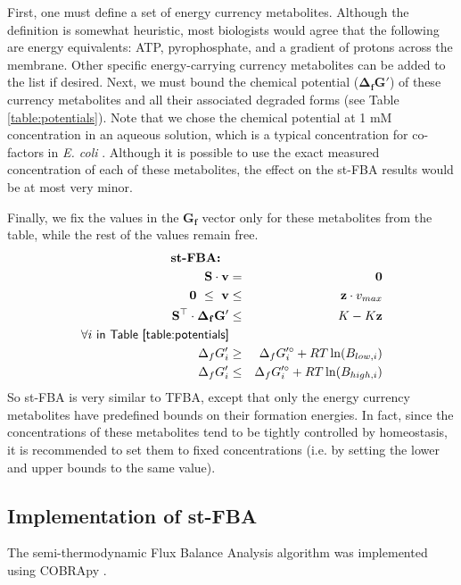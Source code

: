 \documentclass[twocolumn]{article}
\begin{document}
First, one must define a set of energy currency metabolites. Although the definition is somewhat heuristic, most biologists would agree that the following are energy equivalents: ATP, pyrophosphate, and a gradient of protons across the membrane. Other specific energy-carrying currency metabolites can be added to the list if desired. Next, we must bound the chemical potential ($\mathbf{\Delta_f G'}$) of these currency metabolites and all their associated degraded forms (see Table \ref{table:potentials}). Note that we chose the chemical potential at 1 mM concentration in an aqueous solution, which is a typical concentration for co-factors in \emph{E. coli} \cite{Bennett2009-rm}. Although it is possible to use the exact measured concentration of each of these metabolites, the effect on the st-FBA results would be at most very minor. 

Finally, we fix the values in the $\mathbf{G_f}$ vector only for these metabolites from the table, while the rest of the values remain free.
\begin{eqnarray}
\textbf{st-FBA:}~~\nonumber\\
\mathbf{S} \cdot \mathbf{v} &=& \mathbf{0} \label{eq:stfba1}\\
\mathbf{0} ~\leq~ \mathbf{v} &\leq & \mathbf{z} \cdot v_{max} \label{eq:stfba2}\\
\mathbf{S}^\top \cdot \mathbf{\Delta_f G'} &\leq & K - K\mathbf{z} \label{eq:stfba3}\\
\forall i~\textsf{in Table \ref{table:potentials}}\nonumber\\
\Delta_f G'_i & \geq & \Delta_f G'^\circ_i + RT \ln(B_{low,i}) \\
\Delta_f G'_i & \leq & \Delta_f G'^\circ_i + RT \ln(B_{high,i})
\end{eqnarray}
So st-FBA is very similar to TFBA, except that only the energy currency metabolites have predefined bounds on their formation energies. In fact, since the concentrations of these metabolites tend to be tightly controlled by homeostasis, it is recommended to set them to fixed concentrations (i.e. by setting the lower and upper bounds to the same value).

\subsection*{Implementation of st-FBA}
The semi-thermodynamic Flux Balance Analysis algorithm was implemented using COBRApy \cite{Ebrahim2013-vw}.

\end{document}
